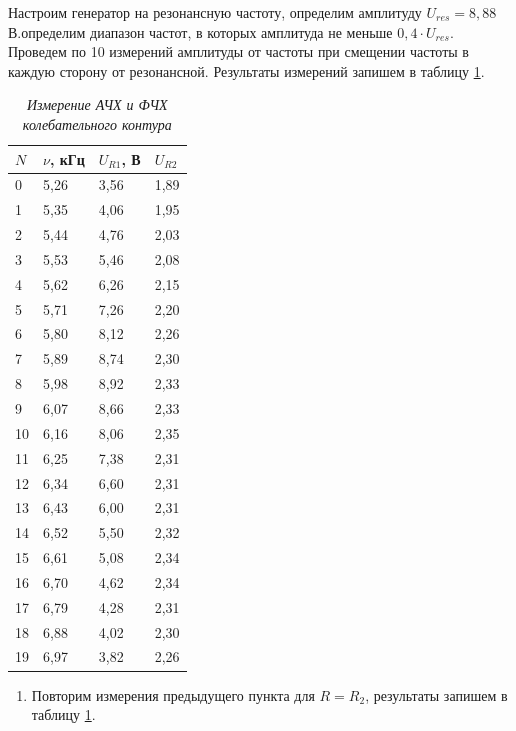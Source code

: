 \documentclass[a4paper,12pt]{article}
\begin{document}
Настроим генератор на резонансную частоту, определим амплитуду $U_{res} = 8,88$ В.определим диапазон частот, в которых амплитуда не меньше $0,4 \cdot U_{res}$. Проведем по 10 измерений амплитуды от частоты при смещении частоты в каждую сторону от резонансной. Результаты измерений запишем в таблицу \ref{table:3}.

\begin{table}[!ht]
    \centering
    \begin{tabular}{|l|l|l|l|}
    \hline
        $N$ & $\nu$, кГц & $U_{R1}$, В & $U_{R2}$ \\ \hline
        0 & 5,26 & 3,56 & 1,89 \\ \hline
        1 & 5,35 & 4,06 & 1,95 \\ \hline
        2 & 5,44 & 4,76 & 2,03 \\ \hline
        3 & 5,53 & 5,46 & 2,08 \\ \hline
        4 & 5,62 & 6,26 & 2,15 \\ \hline
        5 & 5,71 & 7,26 & 2,20 \\ \hline
        6 & 5,80 & 8,12 & 2,26 \\ \hline
        7 & 5,89 & 8,74 & 2,30 \\ \hline
        8 & 5,98 & 8,92 & 2,33 \\ \hline
        9 & 6,07 & 8,66 & 2,33 \\ \hline
        10 & 6,16 & 8,06 & 2,35 \\ \hline
        11 & 6,25 & 7,38 & 2,31 \\ \hline
        12 & 6,34 & 6,60 & 2,31 \\ \hline
        13 & 6,43 & 6,00 & 2,31 \\ \hline
        14 & 6,52 & 5,50 & 2,32 \\ \hline
        15 & 6,61 & 5,08 & 2,34 \\ \hline
        16 & 6,70 & 4,62 & 2,34 \\ \hline
        17 & 6,79 & 4,28 & 2,31 \\ \hline
        18 & 6,88 & 4,02 & 2,30 \\ \hline
        19 & 6,97 & 3,82 & 2,26 \\ \hline
    \end{tabular}\caption{\textit{Измерение АЧХ и ФЧХ колебательного контура}}\label{table:3}
\end{table}

\begin{enumerate}[resume]
    \item Повторим измерения предыдущего пункта для $R = R_2$, результаты запишем в таблицу \ref{table:3}.
\end{enumerate}
\end{document}
